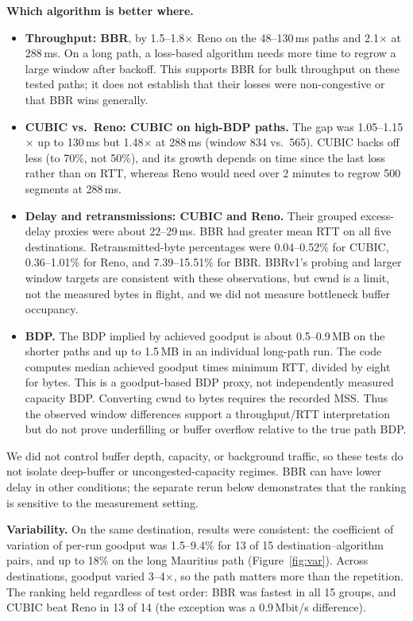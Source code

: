 \documentclass[11pt]{article}
\begin{document}
\textbf{Which algorithm is better where.}
\begin{itemize}
\item \textbf{Throughput: BBR}, by 1.5--1.8$\times$ Reno on the
  48--130\,ms paths and 2.1$\times$ at 288\,ms. On a long path, a loss-based
  algorithm needs more time to regrow a large window after backoff. This
  supports BBR for bulk throughput on these tested paths; it does not
  establish that their losses were non-congestive or that BBR wins generally.
\item \textbf{CUBIC vs.\ Reno: CUBIC on high-BDP paths.} The gap was
  1.05--1.15$\times$ up to 130\,ms but 1.48$\times$ at 288\,ms (window 834
  vs.\ 565). CUBIC backs off less (to 70\%, not 50\%), and its growth depends
  on time since the last loss rather than on RTT, whereas Reno would need
  over 2 minutes to regrow 500 segments at 288\,ms.
\item \textbf{Delay and retransmissions: CUBIC and Reno.} Their grouped
  excess-delay proxies were about 22--29\,ms. BBR had greater mean RTT on
  all five destinations. Retransmitted-byte percentages were
  0.04--0.52\% for CUBIC, 0.36--1.01\% for Reno, and 7.39--15.51\% for BBR.
  BBRv1's probing and larger window targets are consistent with these
  observations, but cwnd is a limit, not the measured bytes in flight, and
  we did not measure bottleneck buffer occupancy.
\item \textbf{BDP.} The BDP implied by achieved goodput is about
  0.5--0.9\,MB on the shorter paths and up to 1.5\,MB in an individual
  long-path run. The code computes median achieved goodput times minimum
  RTT, divided by eight for bytes. This is a goodput-based BDP proxy, not
  independently measured capacity BDP. Converting cwnd to bytes requires
  the recorded MSS. Thus the observed window differences support a
  throughput/RTT interpretation but do not prove underfilling or buffer
  overflow relative to the true path BDP.
\end{itemize}

We did not control buffer depth, capacity, or background traffic, so these
tests do not isolate deep-buffer or uncongested-capacity regimes. BBR can
have lower delay in other conditions; the separate rerun below demonstrates
that the ranking is sensitive to the measurement setting.

\textbf{Variability.} On the same destination, results were consistent:
the coefficient of variation of per-run goodput was 1.5--9.4\% for 13 of 15
destination--algorithm pairs, and up to 18\% on the long Mauritius path
(Figure~\ref{fig:var}). Across destinations, goodput varied 3--4$\times$, so
the path matters more than the repetition. The ranking held regardless of
test order: BBR was fastest in all 15 groups, and CUBIC beat Reno in 13 of 14
(the exception was a 0.9\,Mbit/s difference).
\end{document}
